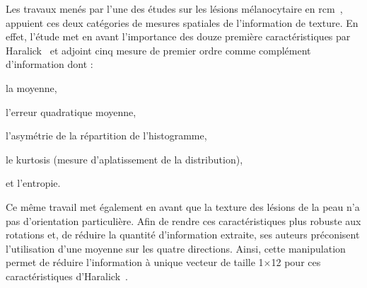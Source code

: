 Les travaux menés par l'une des études sur les lésions mélanocytaire en \gls{rcm}~\cite{Wiltgen2008}, appuient ces deux catégories de mesures spatiales de l'information de texture. En effet, l'étude met en avant l'importance des douze première caractéristiques par Haralick~\cite{Haralick1973} et adjoint cinq mesure de premier ordre comme complément d'information dont :
\begin{inlinerate}
    \item la moyenne,
    \item l'erreur quadratique moyenne,
    \item l'asymétrie de la répartition de l'histogramme,
    \item le kurtosis (mesure d'aplatissement de la distribution),
    \item et l'entropie.
\end{inlinerate}
Ce même travail met également en avant que la texture des lésions de la peau n'a pas d'orientation particulière. Afin de rendre ces caractéristiques plus robuste aux rotations et, de réduire la quantité d'information extraite, ses auteurs préconisent l'utilisation d'une moyenne sur les quatre directions. Ainsi, cette manipulation permet de réduire l'information à unique vecteur de taille 1$\times$12 pour ces caractéristiques d'Haralick~\cite{Wiltgen2008}.\par

